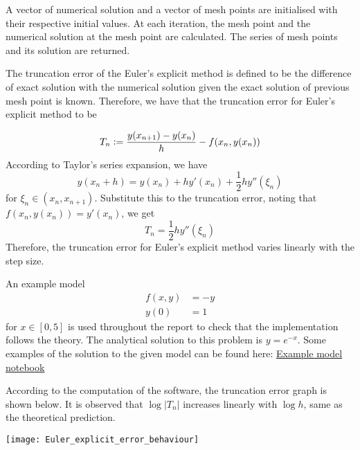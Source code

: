 A vector of numerical solution and a vector of mesh points are initialised with their respective initial values. At each iteration, the mesh point and the numerical solution at the mesh point are calculated. The series of mesh points and its solution are returned.

The truncation error of the Euler's explicit method is defined to be the difference of exact solution with the numerical solution given the exact solution of previous mesh point is known. Therefore, we have that the truncation error for Euler's explicit method to be

\begin{equation}
\label{eqn:trun_err_def}
    T_n \vcentcolon= \frac{y(x_{n+1}) - y(x_{n})}{h} - f(x_n, y(x_n))
\end{equation}
According to Taylor's series expansion, we have 
\begin{equation}
    y(x_n + h) = y(x_n) + hy'(x_n) + \frac{1}{2}hy''(\xi_n)
\end{equation}
for $\xi_n \in (x_n, x_{n+1})$. Substitute this to the truncation error, noting that $f(x_n, y(x_n)) = y'(x_n)$, we get
\begin{equation}
    T_n = \frac{1}{2}hy''(\xi_n)
\end{equation}
Therefore, the truncation error for Euler's explicit method varies linearly with the step size.

An example model 
\begin{align}
\label{eqn:example_model}
    f(x,y) &= -y \\
    y(0) &= 1
\end{align}
for $x \in [0, 5]$ is used throughout the report to check that the implementation follows the theory. The analytical solution to this problem is $y = e^{-x}$. Some examples of the solution to the given model can be found here: \href{https://nbviewer.jupyter.org/github/FarmHJ/numerical-solver/blob/main/examples/solver_convergence.ipynb}{Example model notebook}

According to the computation of the software, the truncation error graph is shown below. It is observed that $\log |T_n|$ increases linearly with $\log h$, same as the theoretical prediction. 

\texttt{[image: Euler\_explicit\_error\_behaviour]}

